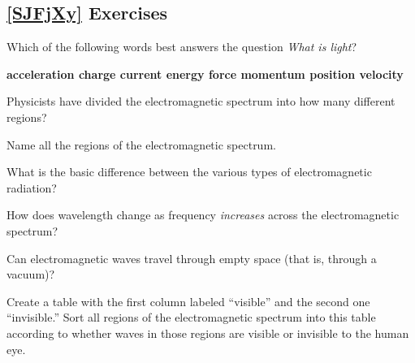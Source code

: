 \documentclass[main.tex]{subfiles}
\begin{document}
\clearpage

\subsection*{\ref{SJFjXy} Exercises}

\begin{exercise}
    Which of the following words best answers the question \textit{What is light}?

\begin{mdframed}[backgroundcolor=black!10]
    \begin{center}
        \textbf{
        acceleration \hfill
        charge \hfill
        current \hfill
        energy \hfill
        force \hfill
        momentum \hfill
        position \hfill
        velocity \hfill
        }
    \end{center}
\end{mdframed}
\end{exercise}

\begin{exercise}
    Physicists have divided the electromagnetic spectrum into how many different regions?
\end{exercise}

\begin{exercise}
    Name all the regions of the electromagnetic spectrum.
\end{exercise}

\begin{exercise}
    What is the basic difference between the various types of electromagnetic radiation?
\end{exercise}

\begin{exercise}
    How does wavelength change as frequency \textit{increases} across the electromagnetic spectrum?
\end{exercise}

\begin{exercise}
    Can electromagnetic waves travel through empty space (that is, through a vacuum)?
\end{exercise}

\begin{exercise}
    Create a table with the first column labeled ``visible'' and the second one ``invisible.'' Sort all regions of the electromagnetic spectrum into this table according to whether waves in those regions are visible or invisible to the human eye.
\end{exercise}
\end{document}
